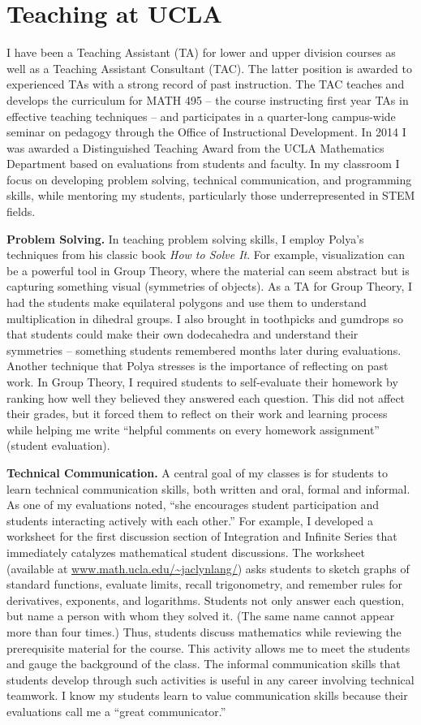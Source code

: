 \documentclass[12pt]{article}
\begin{document}
\section*{Teaching at UCLA}
I have been a Teaching Assistant (TA) for lower and upper division courses as well as a Teaching Assistant Consultant (TAC).  The latter position is awarded to experienced TAs with a strong record of past instruction.  The TAC teaches and develops the curriculum for MATH 495 -- the course instructing first year TAs in effective teaching techniques -- and participates in a quarter-long campus-wide seminar on pedagogy through the Office of Instructional Development.  In 2014 I was awarded a Distinguished Teaching Award from the UCLA Mathematics Department based on evaluations from students and faculty.  In my classroom I focus on developing problem solving, technical communication, and programming skills, while mentoring my students, particularly those underrepresented in STEM fields.

\textbf{Problem Solving.}  In teaching problem solving skills, I employ Polya's techniques from his classic book \textit{How to Solve It}.  For example, visualization can be a powerful tool in Group Theory, where the material can seem abstract but is capturing something visual (symmetries of objects).  As a TA for Group Theory, I had the students make equilateral polygons and use them to understand multiplication in dihedral groups.  I also brought in toothpicks and gumdrops so that students could make their own dodecahedra and understand their symmetries -- something students remembered months later during evaluations.  Another technique that Polya stresses is the importance of reflecting on past work.  In Group Theory, I required students to self-evaluate their homework by ranking how well they believed they answered each question.  This did not affect their grades, but it forced them to reflect on their work and learning process while helping me write ``helpful comments on every homework assignment'' (student evaluation). 

\textbf{Technical Communication.}  A central goal of my classes is for students to learn technical communication skills, both written and oral, formal and informal.  As one of my evaluations noted, ``she encourages student participation and students interacting actively with each other.''  For example,  I developed a worksheet for the first discussion section of Integration and Infinite Series that immediately catalyzes mathematical student discussions.  The worksheet (available at \url{www.math.ucla.edu/~jaclynlang/}) asks students to sketch graphs of standard functions, evaluate limits, recall trigonometry, and remember rules for derivatives, exponents, and logarithms.  Students not only answer each question, but name a person with whom they solved it.  (The same name cannot appear more than four times.)  Thus, students discuss mathematics while reviewing the prerequisite material for the course.  This activity allows me to meet the students and gauge the background of the class.  The informal communication skills that students develop through such activities is useful in any career involving technical teamwork.  I know my students learn to value communication skills because their evaluations call me a ``great communicator.''    
\end{document}

